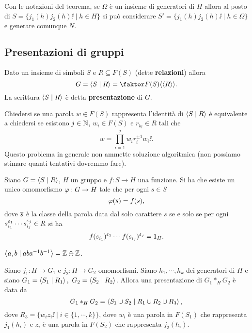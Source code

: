 \begin{multicols*}{2}
\begin{fact}\label{PerNormaleProdottoAmalgamatoBastaImporreRelazioniSuGeneratori}
Con le notazioni del teorema, se $\Omega$ \`e un insieme di generatori di $H$ allora al posto di $S=\{j_1(h)j_2(h)\ii\mid h\in H\}$ si pu\`o considerare $S'=\{j_1(h)j_2(h)\ii\mid h\in \Omega\}$ e generare comunque $N$.
\end{fact}

\subsection{Presentazioni di gruppi}
\begin{definition}[Presentazione]
Dato un insieme di simboli $S$ e $R\subseteq F(S)$  (dette \textbf{relazioni}) allora
\[G=\ps{S\mid R}=\quot {F(S)}{\ps{\ps{R}}}.\]
La scrittura $\left\langle S\mid R\right\rangle$ \`e detta \textbf{presentazione} di $G$.
\end{definition}
\begin{remark}
Chiedersi se una parola $w\in F(S)$ rappresenta l'identit\`a di $\left\langle S\mid R\right\rangle$ \`e equivalente a chiedersi se esistono $j\in\mathbb{N}$, $w_i\in F(S)$ e $r_{k_i}\in R$ tali che
\[w=\prod_{i=1}^jw_ir_i^{\pm 1}w_i\ii.\]
Questo problema in generale non ammette soluzione algoritmica (non possiamo stimare quanti tentativi dovremmo fare).
\end{remark}

\begin{proposition}\label{ProprietaUniversalePresentazioni}
Siano $G=\left\langle S\mid R\right\rangle$, $H$ un gruppo e $f:S\to H$ una funzione. Si ha che esiste un unico omomorfismo $\varphi:G\to H$ tale che per ogni $s\in S$ \[\varphi(\overline{s})=f(s),\] dove $\overline{s}$ \`e la classe della parola data dal solo carattere $s$ se e solo se per ogni $s_{i_1}^{\varepsilon_1}\cdots s_{i_j}^{\varepsilon_j}\in R$ si ha
\[f(s_{i_1})^{\varepsilon_1}\cdots f(s_{i_j})^{\varepsilon_j}=1_H.\]
\end{proposition}

\begin{example}
$\left\langle a,b\mid aba^{-1} b^{-1}\right\rangle=\mathbb{Z}\oplus\mathbb{Z}$.
\end{example}

\begin{proposition}\label{PresentazioneProdottoAmalgamato}
Siano $j_1:H\to G_1$ e $j_2:H\to G_2$ omomorfismi. Siano $h_1,\cdots, h_k$ dei generatori di $H$ e siano $G_1=\ps{S_1\mid R_1},\ G_2=\ps{S_2\mid R_2}$. Allora una presentazione di $G_1\ast_H G_2$ \`e data da
\[G_1\ast_HG_2=\left\langle S_1\cup S_2\mid R_1\cup R_2\cup R_3\right\rangle,\]
dove $R_3=\{w_iz_i\ii \mid i\in \{1,\cdots, k\}\}$, dove $w_i$ \`e una parola in $F(S_1)$ che rappresenta $j_1(h_i)$ e $z_i$ \`e una parola in $F(S_2)$ che rappresenta $j_2(h_i)$.
\end{proposition}

\end{multicols*}
